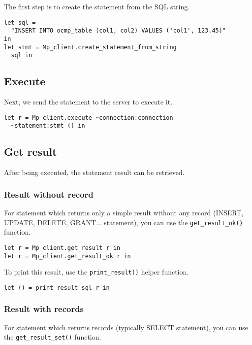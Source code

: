 \documentclass[a4paper, english, 11pt]{article}
\begin{document}
The first step is to create the statement from the SQL string.

\begin{verbatim}
let sql = 
  "INSERT INTO ocmp_table (col1, col2) VALUES ('col1', 123.45)"
in
let stmt = Mp_client.create_statement_from_string
  sql in
\end{verbatim}

\subsection{Execute}

Next, we send the statement to the server to execute it.

\begin{verbatim}
let r = Mp_client.execute ~connection:connection 
  ~statement:stmt () in
\end{verbatim}

\subsection{Get result}

After being executed, the statement result can be retrieved.

\subsubsection{Result without record}

For statement which returns only a simple result without any record (INSERT, UPDATE, DELETE, GRANT... statement), you can use the \texttt{get\_result\_ok()} function.

\begin{verbatim}
let r = Mp_client.get_result r in
let r = Mp_client.get_result_ok r in
\end{verbatim}

To print this result, use the \texttt{print\_result()} helper function.

\begin{verbatim}
let () = print_result sql r in
\end{verbatim}

\subsubsection{Result with records}

For statement which returns records (typically SELECT statement), you can use the \texttt{get\_result\_set()} function.
\end{document}
